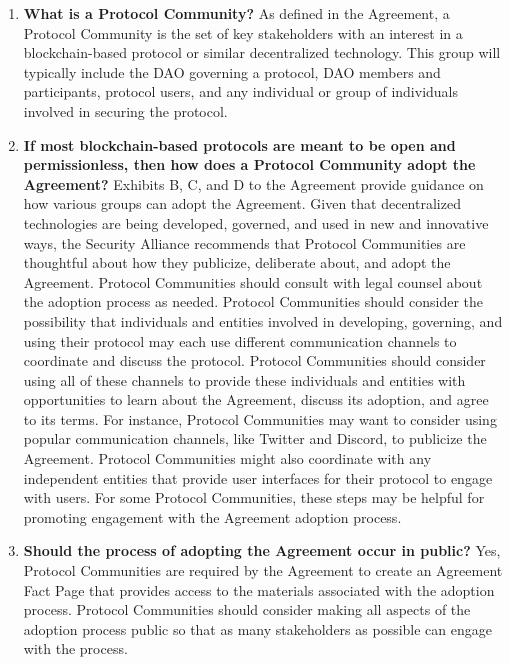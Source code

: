 \begin{enumerate}
    \item \textbf{What is a Protocol Community?} As defined in the Agreement, a Protocol Community is the set of key stakeholders with an interest in a blockchain-based protocol or similar decentralized technology. This group will typically include the DAO governing a protocol, DAO members and participants, protocol users, and any individual or group of individuals involved in securing the protocol.

    \item \textbf{If most blockchain-based protocols are meant to be open and permissionless, then how does a Protocol Community adopt the Agreement?} Exhibits B, C, and D to the Agreement provide guidance on how various groups can adopt the Agreement. Given that decentralized technologies are being developed, governed, and used in new and innovative ways, the Security Alliance recommends that Protocol Communities are thoughtful about how they publicize, deliberate about, and adopt the Agreement. Protocol Communities should consult with legal counsel about the adoption process as needed. Protocol Communities should consider the possibility that individuals and entities involved in developing, governing, and using their protocol may each use different communication channels to coordinate and discuss the protocol. Protocol Communities should consider using all of these channels to provide these individuals and entities with opportunities to learn about the Agreement, discuss its adoption, and agree to its terms. For instance, Protocol Communities may want to consider using popular communication channels, like Twitter and Discord, to publicize the Agreement. Protocol Communities might also coordinate with any independent entities that provide user interfaces for their protocol to engage with users. For some Protocol Communities, these steps may be helpful for promoting engagement with the Agreement adoption process.

    \item \textbf{Should the process of adopting the Agreement occur in public?} Yes, Protocol Communities are required by the Agreement to create an Agreement Fact Page that provides access to the materials associated with the adoption process. Protocol Communities should consider making all aspects of the adoption process public so that as many stakeholders as possible can engage with the process.



\end{enumerate}
